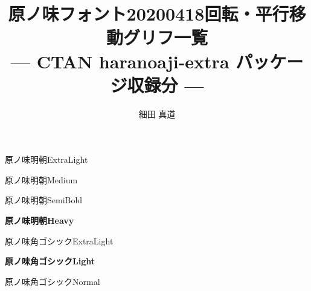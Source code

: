 \documentclass[dvipdfmx]{jsarticle}
\title{原ノ味フォント20200418回転・平行移動グリフ一覧 \\
--- CTAN haranoaji-extra パッケージ収録分 ---}
\author{細田 真道}
\begin{document}
\maketitle

\clearpage
\parindent=0pt
\fboxsep=0pt

\mcfamily\ltseries
{\Large 原ノ味明朝\textmd{ExtraLight}}

\testAll

\clearpage

\mcfamily\mdseries
{\Large 原ノ味明朝\textmd{Medium}}

\testAll

\clearpage

\mgfamily %
{\Large 原ノ味明朝\textmd{SemiBold}}

\testAll

\clearpage

\mcfamily\bfseries
{\Large 原ノ味明朝\textmd{Heavy}}

\testAll

\clearpage

\gtfamily\mdseries
{\Large 原ノ味角ゴシック\textmd{ExtraLight}}

\testAll

\clearpage

\gtfamily\bfseries
{\Large 原ノ味角ゴシック\textmd{Light}}

\testAll

\clearpage

\gtfamily\ebseries
{\Large 原ノ味角ゴシック\textmd{Normal}}

\testAll
\end{document}
